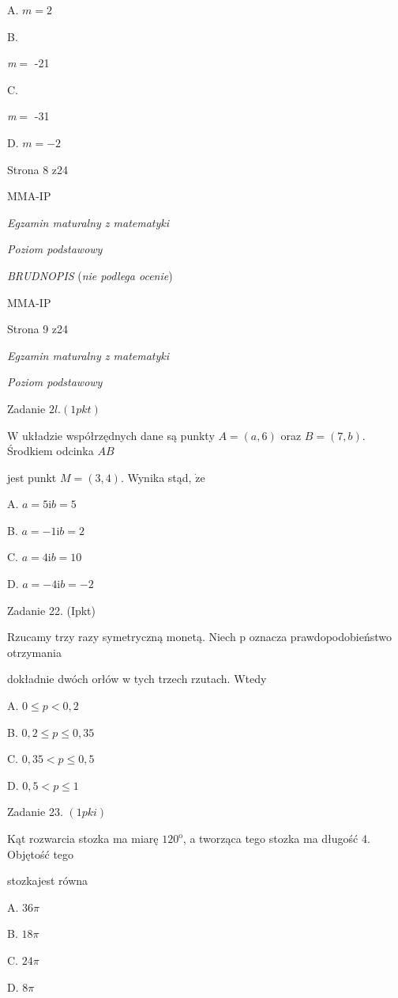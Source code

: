 \documentclass[a4paper,12pt]{article}
\begin{document}
A. $m=2$

B.

{\it m}$=$ -21

C.

{\it m}$=$ -31

D. $m=-2$

Strona 8 z24

MMA-IP





{\it Egzamin maturalny z matematyki}

{\it Poziom podstawowy}

{\it BRUDNOPIS} ({\it nie podlega ocenie})

MMA-IP

Strona 9 z24





{\it Egzamin maturalny z matematyki}

{\it Poziom podstawowy}

Zadanie $2l. (1pkt)$

$\mathrm{W}$ układzie współrzędnych dane są punkty $A=(a,6)$ oraz $B=(7,b)$. Środkiem odcinka $AB$

jest punkt $M=(3,4)$. Wynika stąd, $\dot{\mathrm{z}}\mathrm{e}$

A. $a=5 \mathrm{i}b=5$

B. $a=-1 \mathrm{i}b=2$

C. $a=4\mathrm{i}b=10$

D. $a=-4 \mathrm{i}b=-2$

Zadanie 22. (Ipkt)

Rzucamy trzy razy symetryczną monetą. Niech p oznacza prawdopodobieństwo otrzymania

dokładnie dwóch orłów w tych trzech rzutach. Wtedy

A. $0\leq p<0,2$

B. $0,2\leq p\leq 0,35$

C. $0,35<p\leq 0,5$

D. $0,5<p\leq 1$

Zadanie 23. $(1pki)$

Kąt rozwarcia stozka ma miarę $120^{\mathrm{o}}$, a tworząca tego stozka ma długość 4. Objętość tego

stozkajest równa

A. $ 36\pi$

B. $ 18\pi$

C. $ 24\pi$

D. $ 8\pi$
\end{document}
